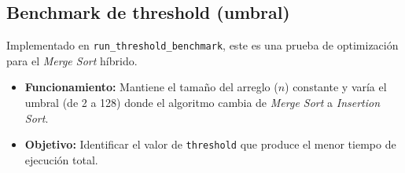\subsection{Benchmark de threshold (umbral)}
Implementado en \texttt{run\_threshold\_benchmark}, este es una prueba de optimización para el \textit{Merge Sort} híbrido.
\begin{itemize}
    \item \textbf{Funcionamiento:} Mantiene el tamaño del arreglo ($n$) constante y varía el umbral (de 2 a 128) donde el algoritmo cambia de \textit{Merge Sort} a \textit{Insertion Sort}.
    \item \textbf{Objetivo:} Identificar el valor de \texttt{threshold} que produce el menor tiempo de ejecución total.
\end{itemize}